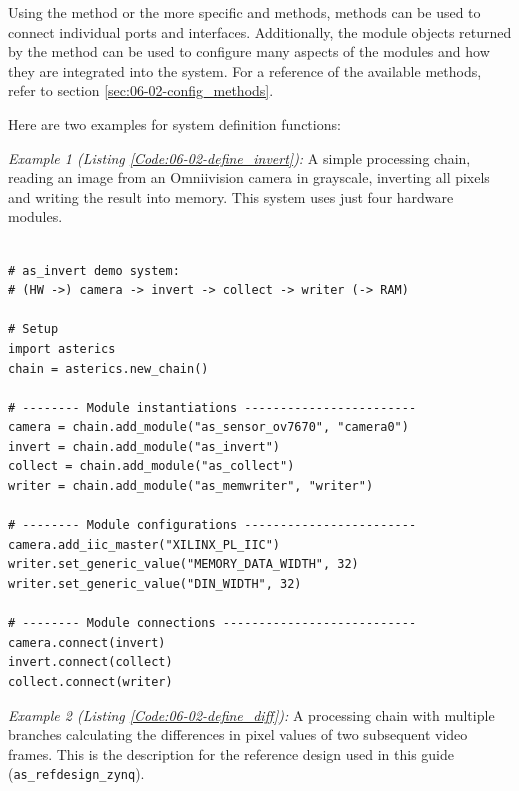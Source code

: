Using the  method or the more specific  and  methods,  methods can be used to connect individual ports and interfaces.
Additionally, the module objects returned by the  method can be used to configure many aspects of the modules and how they are integrated into the \asterics system.
For a reference of the available methods, refer to section \ref{sec:06-02-config_methods}.

Here are two examples for system definition functions:

\medskip

\textit{Example 1 (Listing \ref{Code:06-02-define_invert}):} A simple processing chain, reading an image from an Omniivision camera in grayscale, inverting all pixels and writing the result into memory.
This system uses just four hardware modules.

\begin{lstlisting}[style=AutomaticsPython, label=Code:06-02-define_invert, caption=Definition of a simple invert system]

# as_invert demo system:
# (HW ->) camera -> invert -> collect -> writer (-> RAM)

# Setup
import asterics
chain = asterics.new_chain()

# -------- Module instantiations ------------------------
camera = chain.add_module("as_sensor_ov7670", "camera0")
invert = chain.add_module("as_invert")
collect = chain.add_module("as_collect")
writer = chain.add_module("as_memwriter", "writer")

# -------- Module configurations ------------------------
camera.add_iic_master("XILINX_PL_IIC")
writer.set_generic_value("MEMORY_DATA_WIDTH", 32)
writer.set_generic_value("DIN_WIDTH", 32)

# -------- Module connections ---------------------------
camera.connect(invert)
invert.connect(collect)
collect.connect(writer)
\end{lstlisting}

\bigskip

\textit{Example 2 (Listing \ref{Code:06-02-define_diff}):} A processing chain with multiple branches calculating the differences in pixel values of two subsequent video frames.
This is the description for the reference design used in this guide (\texttt{as\_refdesign\_zynq}).
\medskip

